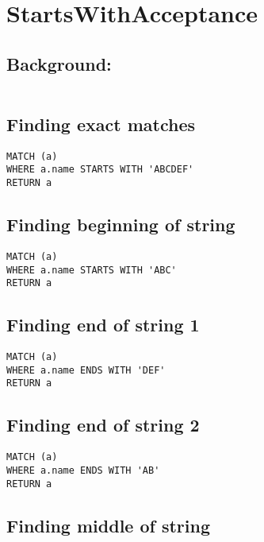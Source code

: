 \section{StartsWithAcceptance}


\subsection{Background:}

\begin{lstlisting}
\end{lstlisting}

\subsection{Finding exact matches}

\begin{lstlisting}
MATCH (a)
WHERE a.name STARTS WITH 'ABCDEF'
RETURN a
\end{lstlisting}

\subsection{Finding beginning of string}

\begin{lstlisting}
MATCH (a)
WHERE a.name STARTS WITH 'ABC'
RETURN a
\end{lstlisting}

\subsection{Finding end of string 1}

\begin{lstlisting}
MATCH (a)
WHERE a.name ENDS WITH 'DEF'
RETURN a
\end{lstlisting}

\subsection{Finding end of string 2}

\begin{lstlisting}
MATCH (a)
WHERE a.name ENDS WITH 'AB'
RETURN a
\end{lstlisting}

\subsection{Finding middle of string}

